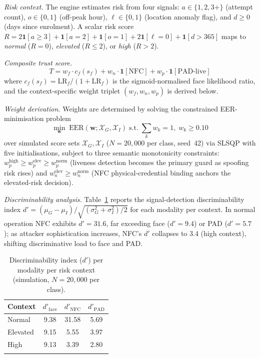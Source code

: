 \documentclass[pdflatex,sn-mathphys-num]{sn-jnl}%
\theoremstyle{thmstyleone}%
\theoremstyle{thmstyletwo}%
\theoremstyle{thmstylethree}%
\begin{document}
\textit{Risk context.} The engine estimates risk from four signals:
\(a \in \{1,2,3+\}\) (attempt count), \(o \in \{0,1\}\) (off-peak hour),
\(\ell \in \{0,1\}\) (location anomaly flag), and \(d \geq 0\) (days since
enrolment). A scalar risk score
\(R = 2\mathbf{1}[a \geq 3] + \mathbf{1}[a=2] + \mathbf{1}[o=1] +
2\mathbf{1}[\ell=0] + \mathbf{1}[d>365]\) maps to \textit{normal} (\(R=0\)),
\textit{elevated} (\(R \leq 2\)), or \textit{high} (\(R>2\)).

\textit{Composite trust score.}
\begin{equation}
  T = w_f \cdot c_f(s_f) + w_n \cdot \mathbf{1}[\mathrm{NFC}]
        + w_p \cdot \mathbf{1}[\mathrm{PAD\text{-}live}]
  \label{eq:ats}
\end{equation}
where \(c_f(s_f) = \mathrm{LR}_f/(1+\mathrm{LR}_f)\) is the
sigmoid-normalised face likelihood ratio, and the context-specific weight
triplet \((w_f, w_n, w_p)\) is derived below.

\textit{Weight derivation.} Weights are determined by solving the constrained
EER-minimisation problem
\begin{equation}
  \min_{\mathbf{w}}\;\mathrm{EER}(\mathbf{w};\mathcal{X}_G,\mathcal{X}_I)
  \;\text{s.t.}\;\textstyle\sum_k w_k = 1,\; w_k \geq 0.10
  \label{eq:ats_opt}
\end{equation}
over simulated score sets \(\mathcal{X}_G, \mathcal{X}_I\) (\(N{=}20{,}000\)
per class, seed~42) via SLSQP with five initialisations, subject to three
semantic monotonicity constraints: \(w_p^\text{high}\!\geq
w_p^\text{elev}\!\geq w_p^\text{norm}\) (liveness detection becomes the
primary guard as spoofing risk rises) and \(w_n^\text{elev}\!\geq
w_n^\text{norm}\) (NFC physical-credential binding anchors the elevated-risk
decision).

\textit{Discriminability analysis.} Table~\ref{tab:dprime} reports the
signal-detection discriminability index
\(d' = (\mu_G - \mu_I)/\sqrt{(\sigma_G^2+\sigma_I^2)/2}\) for each modality
per context. In normal operation NFC exhibits \(d'=31.6\), far exceeding face
(\(d'=9.4\)) or PAD (\(d'=5.7\)); as attacker sophistication increases, NFC's
\(d'\) collapses to 3.4 (high context), shifting discriminative load to face
and PAD.

\begin{table}[h]
\caption{Discriminability index (\(d'\)) per modality per risk context
  (simulation, \(N{=}20{,}000\) per class).}
\label{tab:dprime}%
\begin{tabular}{@{}lccc@{}}
\toprule
Context & \(d'_{\mathrm{face}}\) & \(d'_{\mathrm{NFC}}\) & \(d'_{\mathrm{PAD}}\) \\
\midrule
Normal   & 9.38 & 31.58 & 5.69 \\
Elevated & 9.15 &  5.55 & 3.97 \\
High     & 9.13 &  3.39 & 2.80 \\
\botrule
\end{tabular}
\end{table}
\end{document}
